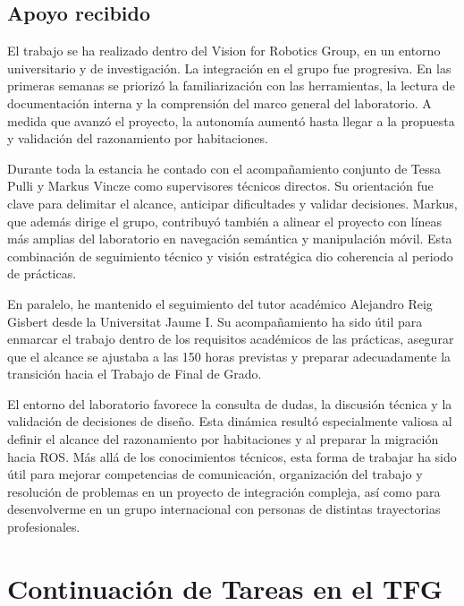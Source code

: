\documentclass[11pt,fleqn,openany]{book} %
\begin{document}
\section{Apoyo recibido}

El trabajo se ha realizado dentro del Vision for Robotics Group, en un entorno universitario y de investigación. La integración en el grupo fue progresiva. En las primeras semanas se priorizó la familiarización con las herramientas, la lectura de documentación interna y la comprensión del marco general del laboratorio. A medida que avanzó el proyecto, la autonomía aumentó hasta llegar a la propuesta y validación del razonamiento por habitaciones.

Durante toda la estancia he contado con el acompañamiento conjunto de Tessa Pulli y Markus Vincze como supervisores técnicos directos. Su orientación fue clave para delimitar el alcance, anticipar dificultades y validar decisiones. Markus, que además dirige el grupo, contribuyó también a alinear el proyecto con líneas más amplias del laboratorio en navegación semántica y manipulación móvil. Esta combinación de seguimiento técnico y visión estratégica dio coherencia al periodo de prácticas.

En paralelo, he mantenido el seguimiento del tutor académico Alejandro Reig Gisbert desde la Universitat Jaume I. Su acompañamiento ha sido útil para enmarcar el trabajo dentro de los requisitos académicos de las prácticas, asegurar que el alcance se ajustaba a las 150 horas previstas y preparar adecuadamente la transición hacia el Trabajo de Final de Grado.

El entorno del laboratorio favorece la consulta de dudas, la discusión técnica y la validación de decisiones de diseño. Esta dinámica resultó especialmente valiosa al definir el alcance del razonamiento por habitaciones y al preparar la migración hacia ROS. Más allá de los conocimientos técnicos, esta forma de trabajar ha sido útil para mejorar competencias de comunicación, organización del trabajo y resolución de problemas en un proyecto de integración compleja, así como para desenvolverme en un grupo internacional con personas de distintas trayectorias profesionales.



\chapter{Continuación de Tareas en el TFG}\label{chap:tfg}
\end{document}
